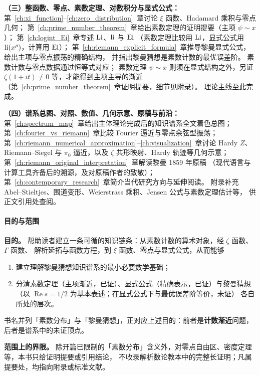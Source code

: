 \textbf{（三）整函数、零点、素数定理、对数积分与显式公式：}\\
第~\ref{ch:xi_function}--\ref{ch:zero_distribution}~章讨论 $\xi$ 函数、Hadamard 乘积与零点几何；
第~\ref{ch:prime_number_theorem}~章给出素数定理的证明提要（主项 $\psi\sim x$）；
第~\ref{ch:logint_Ei}~章专述 $\operatorname{Li}$、$\operatorname{li}$ 与 $\operatorname{Ei}$
（素数定理比较用 $\operatorname{Li}$，显式公式用 $\operatorname{li}(x^{\rho})$，计算用 $\operatorname{Ei}$）；
第~\ref{ch:riemann_explicit_formula}~章推导黎曼显式公式，给出主项与零点振荡的精确结构，
并指出黎曼猜想是素数计数的最优误差阶。
素数计数与零点数据通过恒等式对应；
素数定理 $\psi\sim x$ 则须在显式结构之外，另证 $\zeta(1+it)\neq 0$ 等，才能得到主项主导的渐近
（第~\ref{ch:prime_number_theorem}~章证明提要，细节见附录）。
理论主线至此完成。

\textbf{（四）谱系总图、对照、数值、几何示意、原稿与前沿：}\\
第~\ref{ch:spectrum_map}~章给出主体理论完成后的知识谱系全文着色总图；
第~\ref{ch:fourier_vs_riemann}~章比较 Fourier 逼近与零点余弦型振荡；
第~\ref{ch:riemann_numerical_approximation}--\ref{ch:visualization}~章讨论 Hardy $Z$、
Riemann--Siegel 与 $\pi_0$ 逼近，以及 $\zeta$ 共形映射、Hardy 轨迹等几何示意；
第~\ref{ch:riemann_original_interpretation}~章解读黎曼 1859 年原稿
（现代语言与计算工具齐备后的溯源，及对原稿作者的致敬）；
第~\ref{ch:contemporary_research}~章简介当代研究方向与延伸阅读。
附录补充 Abel--Stieltjes、围道变形、Weierstrass 乘积、Jensen 公式与素数定理估计等，
供正文引用处查阅。

\paragraph{目的与范围}
\textbf{目的。}
帮助读者建立一条可循的知识链条：从素数计数的算术对象，经 $\zeta$ 函数、$\Gamma$ 函数、
解析延拓与函数方程，到 $\xi$ 函数、零点与显式公式，从而能够
\begin{enumerate}
  \item 建立理解黎曼猜想知识谱系的最小必要数学基础；
  \item 分清素数定理（主项渐近，已证）、显式公式（精确表示，已证）与黎曼猜想
        （以 $\operatorname{Re}s=1/2$ 为基本表述；在显式公式下与最优误差阶等价，未证）
        各自所处的层次。
\end{enumerate}
书名并列「素数分布」与「黎曼猜想」，正对应上述目的：前者是\textbf{计数渐近}问题，后者是谱系中的未证顶点。

\textbf{范围上的界限。}
除开篇已限制的「素数分布」含义外，对零点自由区、密度定理等，本书只给证明提要或引用结论，
不收录解析数论教本中的完整长证明；凡属提要处，均指向附录或标准文献。

